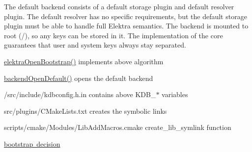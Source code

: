The default backend consists of a default storage plugin and default resolver plugin. The default resolver has no specific requirements, but the default storage plugin must be able to handle full Elektra semantics. The backend is mounted to root ({\ttfamily /}), so any keys can be stored in it. The implementation of the core guarantees that user and system keys always stay separated.


\begin{DoxyItemize}
\item {\ttfamily \mbox{\hyperlink{group__kdb_ga5bfaad0230457cd6386032fe65c41576}{elektra\+Open\+Bootstrap()}}} implements above algorithm
\item {\ttfamily \mbox{\hyperlink{backend_8c_a5227608d302910f25fc3a5c8968ab542}{backend\+Open\+Default()}}} opens the default backend
\item {\ttfamily /src/include/kdbconfig.h.\+in} contains above {\ttfamily K\+D\+B\+\_\+$\ast$} variables
\item {\ttfamily src/plugins/\+C\+Make\+Lists.\+txt} creates the symbolic links
\item {\ttfamily scripts/cmake/\+Modules/\+Lib\+Add\+Macros.\+cmake} {\ttfamily create\+\_\+lib\+\_\+symlink} function
\end{DoxyItemize}


\begin{DoxyItemize}
\item \mbox{\hyperlink{doc_decisions_bootstrap_md}{bootstrap decision}} 
\end{DoxyItemize}